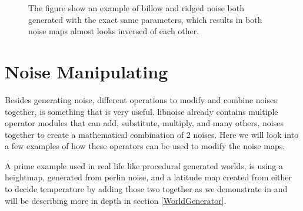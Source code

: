 \begin{figure}[H]
\begin{minipage}[b]{.49\linewidth}
		\label{fig:4b}
	\end{minipage}
	\centering
	\caption{The figure show an example of billow and ridged noise both generated with the exact same parameters, which results in both noise maps almost looks inversed of each other.}
	\label{fig:BillowRidged}
\end{figure}


\section{Noise Manipulating}
\label{NoiseManipulating}
Besides generating noise, different operations to modify and combine noises together, is something that is very useful. libnoise already contains multiple operator modules that can add, substitute, multiply, and many others, noises together to create a mathematical combination of 2 noises. Here we will look into a few examples of how these operators can be used to modify the noise maps.

A prime example used in real life like procedural generated worlds, is using a heightmap, generated from perlin noise, and a latitude map created from either to decide temperature by adding those two together as we demonstrate in  and will be describing more in depth in section \ref{WorldGenerator}.

